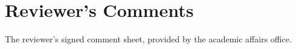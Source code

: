 \chapter*{Reviewer's Comments}
\label{reviewer}

The reviewer's signed comment sheet, provided by the academic affairs office.
